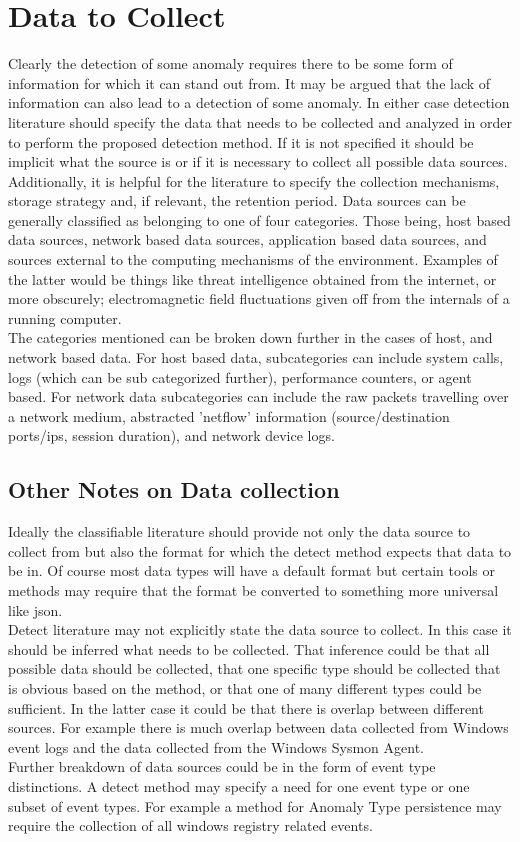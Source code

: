 \documentclass[10pt]{IEEEtran}
\begin{document}
\section{Data to Collect}
Clearly the detection of some anomaly requires there to be some form of information for which it can stand out from. It may be argued that the lack of information can also lead to a detection of some anomaly. In either case detection literature should specify the data that needs to be collected and analyzed in order to perform the proposed detection method. If it is not specified it should be implicit what the source is or if it is necessary to collect all possible data sources. Additionally, it is helpful for the literature to specify the collection mechanisms, storage strategy and, if relevant, the retention period. Data sources can be generally classified as belonging to one of four categories. Those being, host based data sources, network based data sources, application based data sources, and sources external to the computing mechanisms of the environment. Examples of the latter would be things like threat intelligence obtained from the internet, or more obscurely; electromagnetic field fluctuations given off from the internals of a running computer. \\
The categories mentioned can be broken down further in the cases of host, and network based data. For host based data, subcategories can include system calls, logs (which can be sub categorized further), performance counters, or agent based. For network data subcategories can include the raw packets travelling over a network medium, abstracted 'netflow' information (source/destination ports/ips, session duration), and network device logs. \\

\subsection{Other Notes on Data collection}
Ideally the classifiable literature should provide not only the data source to collect from but also the format for which the detect method expects that data to be in. Of course most data types will have a default format but certain tools or methods may require that the format be converted to something more universal like json.\\
Detect literature may not explicitly state the data source to collect. In this case it should be inferred what needs to be collected. That inference could be that all possible data should be collected, that one specific type should be collected that is obvious based on the method, or that one of many different types could be sufficient. In the latter case it could be that there is overlap between different sources. For example there is much overlap between data collected from Windows event logs and the data collected from the Windows Sysmon Agent.\\
Further breakdown of data sources could be in the form of event type distinctions. A detect method may specify a need for one event type or one subset of event types. For example a method for Anomaly Type persistence may require the collection of all windows registry related events.
\end{document}
